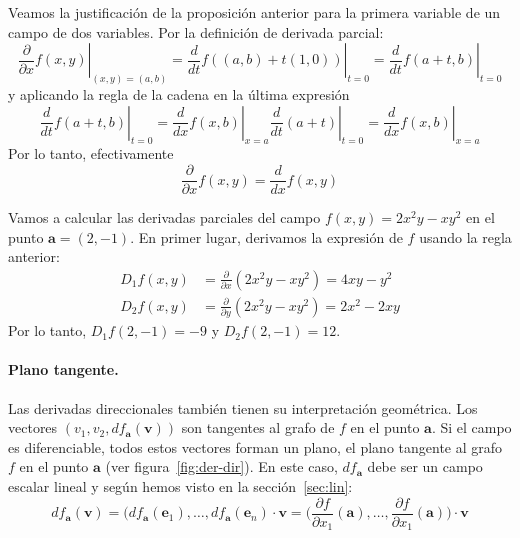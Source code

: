 Veamos la justificación de la proposición anterior para la primera variable de un campo de dos variables.
Por la definición de derivada parcial:
\[
\left.\dfrac{\partial}{\partial x}f(x,y) \right|_{(x,y)=(a,b)}
=\left.\dfrac{d}{dt}f((a,b)+t(1,0)) \right|_{t=0}
=\left.\dfrac{d}{dt}f(a+t,b) \right|_{t=0}
\]
y aplicando la regla de la cadena en la última expresión
\[
\left.\dfrac{d}{dt}f(a+t,b)\right|_{t=0}
=\left.\dfrac{d}{dx}f(x,b)\right|_{x=a}\left.\dfrac{d}{dt}(a+t)\right|_{t=0}
=\left.\dfrac{d}{dx}f(x,b)\right|_{x=a}
\]
Por lo tanto, efectivamente
\[
\frac{\partial}{\partial x} f(x,y) =\dfrac{d}{dx}f(x,y) 
\]
%

\begin{ejemplo-br}\label{ej:der-dif}
Vamos a calcular las derivadas parciales del campo 
$f(x,y)=2x^2y-xy^2$ en el punto $\boldsymbol a=(2,-1)$.
En primer lugar, derivamos la expresión de $f$ usando la regla anterior:
\begin{align*}
D_1f(x,y)&=\frac{\partial}{\partial x} (2x^2y-xy^2) = 4xy-y^2\\
D_2f(x,y)&=\frac{\partial}{\partial y} (2x^2y-xy^2) = 2x^2-2xy
\end{align*}
Por lo tanto, $D_1f(2,-1)=-9$ y $D_2f(2,-1)=12$.\fej
\end{ejemplo-br}

\paragraph{Plano tangente.}

Las derivadas direccionales también tienen su interpretación geométrica.
Los vectores $(v_1,v_2,df_{\boldsymbol a}(\boldsymbol v))$ son tangentes al grafo de $f$ en el punto $\boldsymbol a$.
Si el campo es diferenciable, todos estos vectores forman un plano, el plano tangente al grafo  $f$ en el punto $\boldsymbol a$ (ver figura~\ref{fig:der-dir}).
En este caso, $df_{\boldsymbol a}$ debe ser un campo escalar lineal y según hemos visto en la sección~\ref{sec:lin}:
\[
df_{\boldsymbol a}(\boldsymbol v)=(df_{\boldsymbol a}(\boldsymbol e_1),\dots,df_{\boldsymbol a}(\boldsymbol e_n)\cdot\boldsymbol v =
\big(\dfrac{\partial f}{\partial x_1}(\boldsymbol a),\dots,
\dfrac{\partial f}{\partial x_1}(\boldsymbol a)\big)\cdot\boldsymbol v
\]


